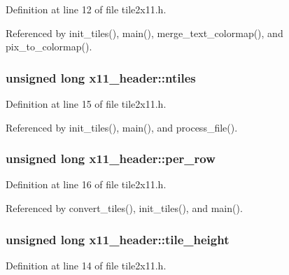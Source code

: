 Definition at line 12 of file tile2x11.\+h.



Referenced by init\+\_\+tiles(), main(), merge\+\_\+text\+\_\+colormap(), and pix\+\_\+to\+\_\+colormap().

\hypertarget{structx11__header_a76bec784f1a45a0ab46189cc413657e9}{
\subsubsection[{ntiles}]{\setlength{\rightskip}{0pt plus 5cm}unsigned long x11\+\_\+header\+::ntiles}}\label{structx11__header_a76bec784f1a45a0ab46189cc413657e9}


Definition at line 15 of file tile2x11.\+h.



Referenced by init\+\_\+tiles(), main(), and process\+\_\+file().

\hypertarget{structx11__header_a0093a0825169d5d844a12cf63462da41}{
\subsubsection[{per\+\_\+row}]{\setlength{\rightskip}{0pt plus 5cm}unsigned long x11\+\_\+header\+::per\+\_\+row}}\label{structx11__header_a0093a0825169d5d844a12cf63462da41}


Definition at line 16 of file tile2x11.\+h.



Referenced by convert\+\_\+tiles(), init\+\_\+tiles(), and main().

\hypertarget{structx11__header_a7fcb99ec6211c004413a72d551e5c30e}{
\subsubsection[{tile\+\_\+height}]{\setlength{\rightskip}{0pt plus 5cm}unsigned long x11\+\_\+header\+::tile\+\_\+height}}\label{structx11__header_a7fcb99ec6211c004413a72d551e5c30e}


Definition at line 14 of file tile2x11.\+h.



